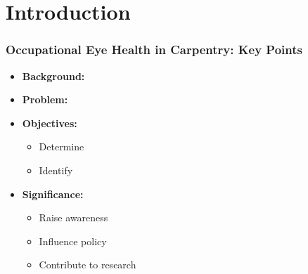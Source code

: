 \section{Introduction}
\begin{frame}[shrink]
    \frametitle{Occupational Eye Health in Carpentry: Key Points}
    \begin{itemize}
        \item \textbf{Background:} 
        \item \textbf{Problem:} 
        \item \textbf{Objectives:} 
            \begin{itemize}
                \item Determine 
                \item Identify 
            \end{itemize}
        \item \textbf{Significance:} 
            \begin{itemize}
                \item Raise awareness 
                \item Influence policy 
                \item Contribute to research 
            \end{itemize}
    \end{itemize}
\end{frame}
    
